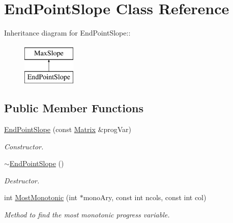\hypertarget{classEndPointSlope}{
\section{EndPointSlope Class Reference}
\label{da/d7d/classEndPointSlope}
}
Inheritance diagram for EndPointSlope::\begin{figure}[H]
\begin{center}
\leavevmode
\includegraphics[height=2cm]{da/d7d/classEndPointSlope}
\end{center}
\end{figure}
\subsection*{Public Member Functions}
\begin{DoxyCompactItemize}
\item 
\hyperlink{classEndPointSlope_aa1c680c5137b40a465d2433e636892ce}{EndPointSlope} (const \hyperlink{classMatrix}{Matrix} \&progVar)
\begin{DoxyCompactList}\small\item\em Constructor. \item\end{DoxyCompactList}\item 
\hypertarget{classEndPointSlope_a37cf0a75d426b64fc50a8a76f45beb1f}{
\hyperlink{classEndPointSlope_a37cf0a75d426b64fc50a8a76f45beb1f}{$\sim$EndPointSlope} ()}
\label{da/d7d/classEndPointSlope_a37cf0a75d426b64fc50a8a76f45beb1f}

\begin{DoxyCompactList}\small\item\em Destructor. \item\end{DoxyCompactList}\item 
int \hyperlink{classEndPointSlope_a70417721fe8a60669a67d19a7855bef5}{MostMonotonic} (int $\ast$monoAry, const int ncols, const int col)
\begin{DoxyCompactList}\small\item\em Method to find the most monotonic progress variable. \item\end{DoxyCompactList}\end{DoxyCompactItemize}


